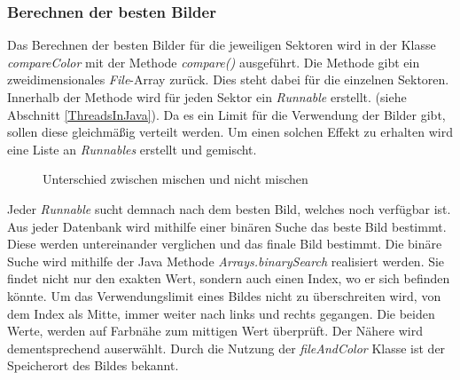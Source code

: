 \newpage

\subsubsection{Berechnen der besten Bilder}
Das Berechnen der besten Bilder für die jeweiligen Sektoren wird in der Klasse \textit{compareColor} mit der Methode \textit{compare()} ausgeführt. Die Methode gibt ein zweidimensionales \textit{File}-Array zurück. Dies steht dabei für die einzelnen Sektoren. Innerhalb der Methode wird für jeden Sektor ein \textit{Runnable} erstellt. (siehe Abschnitt \ref{ThreadsInJava}). Da es ein Limit für die Verwendung der Bilder gibt, sollen diese gleichmäßig verteilt werden. Um einen solchen Effekt zu erhalten wird eine Liste an \textit{Runnables} erstellt und gemischt.

\begin{figure}[h]
    \centering
    \caption[Beste Bilder]{Unterschied zwischen mischen und nicht mischen}
\end{figure}

\begin{sloppypar}
Jeder \textit{Runnable} sucht demnach nach dem besten Bild, welches noch verfügbar ist. Aus jeder Datenbank wird mithilfe einer binären Suche das beste Bild bestimmt. Diese werden untereinander verglichen und das finale Bild bestimmt. Die binäre Suche wird mithilfe der Java Methode \textit{Arrays.binarySearch} realisiert werden. Sie findet nicht nur den exakten Wert, sondern auch einen Index, wo er sich befinden könnte. Um das Verwendungslimit eines Bildes nicht zu überschreiten wird, von dem Index als Mitte, immer weiter nach links und rechts gegangen. Die beiden Werte, werden auf Farbnähe zum mittigen Wert überprüft. Der Nähere wird dementsprechend auserwählt. Durch die Nutzung der \textit{fileAndColor} Klasse ist der Speicherort des Bildes bekannt.
\end{sloppypar}

